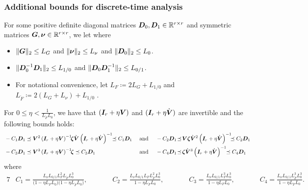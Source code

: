 \subsubsection{Additional bounds for discrete-time analysis}
\begin{proposition}
\label{prop:residualhigherorder} 
For some positive definite diagonal matrices    $\boldsymbol{D}_0,   \boldsymbol{D}_1  \in \mathbb{R}^{r \times r}$ and symmetric matrices $\boldsymbol{G}, \boldsymbol{\nu} \in \mathbb{R}^{r \times r}$, we let
where
\begin{itemize}
\item $\lVert\boldsymbol{G}\rVert_2 \leq L_{G}$ and $\lVert\boldsymbol{\nu}\rVert_2 \leq L_{\nu}$  and  $\lVert\boldsymbol{D}_0 \rVert_2 \leq L_0$.
\item  $ \lVert \boldsymbol{D}_0^{-1}  \boldsymbol{D}_1 \rVert_2  \leq  L_{1/0}$ and  $ \lVert \boldsymbol{D}_0  \boldsymbol{D}_1^{-1} \rVert_2  \leq  L_{0/1}$.
\item For notational convenience,  let $L_F \coloneqq  2 L_{G} +  L_{1/0}$ and $L_{\grave{F}} \coloneqq  2(L_{G} + L_{\nu}) +  L_{1/0}$ . 
\end{itemize}
For   $0 \leq \eta < \tfrac{1}{  L_{\grave{F}}  L_0}$,  we have that $(\boldsymbol{I}_r + \eta  \boldsymbol{V})$ and   $(\boldsymbol{I}_r + \eta  \grave{\boldsymbol{V}})$ are invertible and  the following bounds holds:
\begin{alignat}{3}
&   -  C_1 \bs{D}_1   \preceq \bs{V}^2  \left( \bs{I}_r + \eta   \bs{V} \right)^{-1}  \!\!  \bs{\zeta}     \grave{\bs{V}}   \left( \bs{I}_r + \eta \grave{\bs{V}} \right)^{-1} \!\! \preceq C_1 \bs{D}_1 && ~ \text{and}  ~
&& - C_2 \bs{D}_1  \! \preceq \! \bs{V} \bs{\zeta}     \grave{\bs{V}}^2   \left( \bs{I}_r + \eta \grave{\bs{V}} \right)^{-1}  \!\!\! \preceq C_2 \bs{D}_1     \label{eq:hobound1} \\
&     -   C_3 \bs{D}_1  \preceq \bs{V}^3  \left( \bs{I}_r + \eta   \bs{V} \right)^{-1}  \!\! \bs{\zeta} \preceq C_3 \bs{D}_1    && ~ \text{and}  ~
&& -  C_4 \bs{D}_1 \! \preceq  \! \bs{\zeta}  \grave{\bs{V}}^3  \left( \bs{I}_r + \eta \grave{\bs{V}} \right)^{-1}  \!\!  \preceq C_4 \bs{D}_1   \label{eq:hobound2}
\end{alignat}
where
\begin{alignat}{7}
& C_1 =  \frac{ L_{\nu} L_{0/1} L_F^2  L_{\grave{F}}  L_0^3}{ \big( 1 - \eta  L_{F} L_{0} \big) \big(1 - \eta  L_{\grave{F}}  L_{0} \big)},  && ~ ~  
&&   C_2 =  \frac{ L_{\nu} L_{0/1}  L_F  L_{\grave{F}} ^2 L_0^3}{1 - \eta  L_{\grave{F}}   L_{0}},  &&~ ~ 
&&C_3 =  \frac{ L_{\nu} L_{0/1}    L_F^3  L_0^3}{1 - \eta   L_F  L_{0}},   &&~ ~ 
&&  C_4 = \frac{ L_{\nu} L_{0/1}  L_{\grave{F}}^3  L_0^3}{1 - \eta  L_{\grave{F}}  L_{0}}. 
\end{alignat}
\end{proposition}

